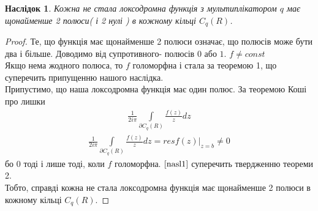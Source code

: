 \documentclass[12pt,a4paper]{article}
\begin{document}
\newtheorem{nasl}{Наслідок}
\begin{nasl}
 Кожна не стала локсодромна функція з мультиплікатором $q$ має щонайменше 2 полюси( і 2 нулі ) в кожному кільці $C_{q}(R)$.
\end{nasl}
\begin{proof}
Те, що функція має щонайменше 2 полюси означає, що полюсів може бути два і більше. Доводимо від супротивного- полюсів $0$ або $1$. $ f \neq const $\\
Якщо нема жодного полюса, то $f$ голоморфна і стала за теоремою 1, що суперечить припущенню нашого наслідка. \\
Припустимо, що наша локсодромна функція має один полюс. За теоремою Коші про лишки
\[\begin{array}{l}
\frac{1}{2i\pi}\int\limits_{\partial C_{q}(R)}^{ } \frac{f(z)}{z}dz 
\end{array}\]
\begin{equation}\label{nasl1}
\begin{array}{l}
\frac{1}{2i\pi}\int\limits_{\partial C_{q}(R)}^{ } \frac{f(z)}{z}dz= resf(z)\big\vert_{z=b} \neq 0 
\end{array} 
\end{equation}
бо $0$ тоді і лише тоді, коли $f$ голоморфна.
$\eqref {nasl1} $ суперечить твердженню теореми 2. \\
Тобто, справді кожна не стала локсодромна функція має щонайменше 2 полюси в кожному кільці $C_{q}(R)$.
\end{proof}
\[\begin{array}{l}
\end{array} \]
\end{document}
